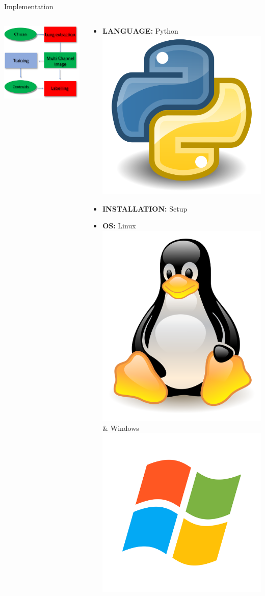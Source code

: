 \documentclass{standalone}
\begin{document}
	\begin{frame}{Implementation}{}		
		\begin{columns}
			\begin{column}{.4\textwidth}
				\centering\includegraphics[width=\linewidth]{./img/Pipeline3}
			\end{column}
			\begin{column}{.4\textwidth}
				\begin{block}{}
					\begin{itemize}
						\item \textbf{LANGUAGE:} \textsf{Python} \includegraphics[width=.05\textwidth]{./img/python}
						\item \textbf{INSTALLATION:} \textsf{Setup}
						\item \textbf{OS:} Linux \includegraphics[width=.05\textwidth]{./img/linux} \&
					Windows \includegraphics[width=.05\textwidth]{./img/windows}

\end{itemize}
\end{block}
\end{column}
\end{columns}
\end{frame}
\end{document}
